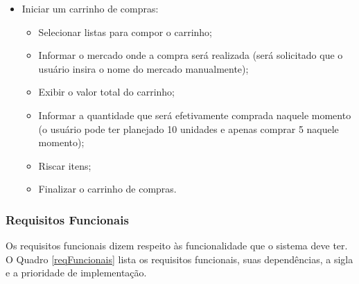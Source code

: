 \begin{itemize}
\begin{itemize}
		\end{itemize}
	\item Iniciar um carrinho de compras:
		\begin{itemize}
			\item Selecionar listas para compor o carrinho;
			\item Informar o mercado onde a compra será realizada (será solicitado que o usuário insira o nome do mercado manualmente);
			\item Exibir o valor total do carrinho;
			\item Informar a quantidade que será efetivamente comprada naquele momento (o usuário pode ter planejado 10 unidades e apenas comprar 5 naquele momento);
			\item Riscar itens;
			\item Finalizar o carrinho de compras.
		\end{itemize}
\end{itemize}

\subsubsection{Requisitos Funcionais}

Os requisitos funcionais dizem respeito às funcionalidade que o sistema deve ter. O Quadro \ref{reqFuncionais} lista os requisitos funcionais, suas dependências, a sigla e a prioridade de implementação.

